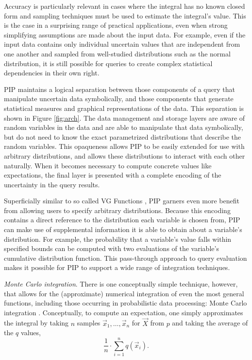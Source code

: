 Accuracy is particularly relevant in cases where the integral has no known closed form and sampling techniques must be used to estimate the integral's value.  This is the case in a surprising range of practical applications, even when strong simplifying assumptions are made about the input data.  For example, even if the input data contains only individual uncertain values that are independent from one another and sampled from well-studied distributions such as the normal distribution, it is still possible for queries to create complex statistical dependencies in their own right.



PIP maintains a logical separation between those components of a query that manipulate uncertain data symbolically, and those components that generate statistical measures and graphical representations of the data.  This separation is shown in Figure \ref{fig:arch}.  The data management and storage layers are aware of random variables in the data and are able to manipulate that data symbolically, but do not need to know the exact parametrized distributions that describe the random variables.  This opaqueness allows PIP to be easily extended for use with arbitrary distributions, and allows these distributions to interact with each other naturally.  When it becomes necessary to compute concrete values like expectations, the final layer is presented with a complete encoding of the uncertainty in the query results.  

Superficially similar to so called VG Functions \cite{MCDB}, PIP garners even more benefit from allowing users to specify arbitrary distributions.  Because this encoding contains a direct reference to the distribution each variable is chosen from, PIP can make use of supplemental information it is able to obtain about a variable's distribution.  For example, the probability that a variable's value falls within specified bounds can be computed with two evaluations of the variable's cumulative distribution function.  This pass-through approach to query evaluation makes it possible for PIP to support a wide range of integration techniques.

{\em Monte Carlo integration}\/.
There is one conceptually simple technique, however, that  allows for the (approximate) numerical integration of even  the most general  functions, including those occurring in  probabilistic data  processing: Monte Carlo integration \cite{montecarlo}. Conceptually, to compute an expectation, one simply approximates   the  integral  by  taking $n$ samples $\vec{x}_1, \dots, \vec{x}_n$ for $\vec{X}$ from $p$  and  taking  the  average of the $q$ values,
%
\begin{equation}\label{eq:mc_expectation}
\frac{1}{n} \cdot \sum_{i=1}^n q(\vec{x}_i).
\end{equation}

